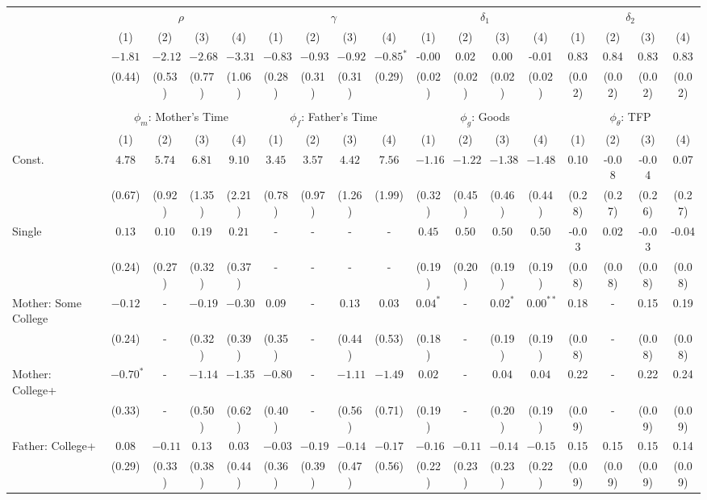 \begin{tabular}{lcccccccccccccccc}\\\toprule
 & \multicolumn{4}{c}{$\rho$} & \multicolumn{4}{c}{$\gamma$} & \multicolumn{4}{c}{$\delta_{1}$} & \multicolumn{4}{c}{$\delta_{2}$} \\
&(1)&(2)&(3)&(4)&(1)&(2)&(3)&(4)&(1)&(2)&(3)&(4)&(1)&(2)&(3)&(4)\\\cmidrule(r){2-5}\cmidrule(r){6-9}\cmidrule(r){10-13}\cmidrule(r){14-17}
&$-1.81$&$-2.12$&$-2.68$&$-3.31$&$-0.83$&$-0.93$&$-0.92$&$-0.85^{*}$&-0.00&0.02&0.00&-0.01&0.83&0.84&0.83&0.83\\
&(0.44)&(0.53)&(0.77)&(1.06)&(0.28)&(0.31)&(0.31)&(0.29)&(0.02)&(0.02)&(0.02)&(0.02)&(0.02)&(0.02)&(0.02)&(0.02)\\
&&&&&&&&&&&&&&&&\\
 & \multicolumn{4}{c}{$\phi_{m}$: Mother's Time} & \multicolumn{4}{c}{$\phi_{f}$: Father's Time} & \multicolumn{4}{c}{$\phi_{g}$: Goods} & \multicolumn{4}{c}{$\phi_{\theta}$: TFP} \\
&(1)&(2)&(3)&(4)&(1)&(2)&(3)&(4)&(1)&(2)&(3)&(4)&(1)&(2)&(3)&(4)\\\cmidrule(r){2-5}\cmidrule(r){6-9}\cmidrule(r){10-13}\cmidrule(r){14-17}
Const.&$4.78$&$5.74$&$6.81$&$9.10$&$3.45$&$3.57$&$4.42$&$7.56$&$-1.16$&$-1.22$&$-1.38$&$-1.48$&0.10&-0.08&-0.04&0.07\\
&(0.67)&(0.92)&(1.35)&(2.21)&(0.78)&(0.97)&(1.26)&(1.99)&(0.32)&(0.45)&(0.46)&(0.44)&(0.28)&(0.27)&(0.26)&(0.27)\\
Single&$0.13$&$0.10$&$0.19$&$0.21$&-&-&-&-&$0.45$&$0.50$&$0.50$&$0.50$&-0.03&0.02&-0.03&-0.04\\
&(0.24)&(0.27)&(0.32)&(0.37)&-&-&-&-&(0.19)&(0.20)&(0.19)&(0.19)&(0.08)&(0.08)&(0.08)&(0.08)\\
Mother: Some College&$-0.12$&-&$-0.19$&$-0.30$&$0.09$&-&$0.13$&$0.03$&$0.04^{*}$&-&$0.02^{*}$&$0.00^{**}$&0.18&-&0.15&0.19\\
&(0.24)&-&(0.32)&(0.39)&(0.35)&-&(0.44)&(0.53)&(0.18)&-&(0.19)&(0.19)&(0.08)&-&(0.08)&(0.08)\\
Mother: College+&$-0.70^{*}$&-&$-1.14$&$-1.35$&$-0.80$&-&$-1.11$&$-1.49$&$0.02$&-&$0.04$&$0.04$&0.22&-&0.22&0.24\\
&(0.33)&-&(0.50)&(0.62)&(0.40)&-&(0.56)&(0.71)&(0.19)&-&(0.20)&(0.19)&(0.09)&-&(0.09)&(0.09)\\
Father: College+&$0.08$&$-0.11$&$0.13$&$0.03$&$-0.03$&$-0.19$&$-0.14$&$-0.17$&$-0.16$&$-0.11$&$-0.14$&$-0.15$&0.15&0.15&0.15&0.14\\
&(0.29)&(0.33)&(0.38)&(0.44)&(0.36)&(0.39)&(0.47)&(0.56)&(0.22)&(0.23)&(0.23)&(0.22)&(0.09)&(0.09)&(0.09)&(0.09)\\

\end{tabular}
